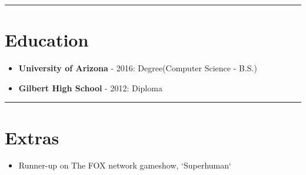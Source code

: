 \documentclass{article}
\begin{document}
\noindent\rule{\linewidth}{1pt}

\section*{Education}

\begin{itemize}\item \textbf{University of Arizona} - 2016: Degree(Computer Science - B.S.)\newline
\newline
\item \textbf{Gilbert High School} - 2012: Diploma\end{itemize}

\noindent\rule{\linewidth}{1pt}

\section*{Extras}

\begin{itemize}\item Runner-up on The FOX network gameshow, `Superhuman`\end{itemize}
\end{document}
